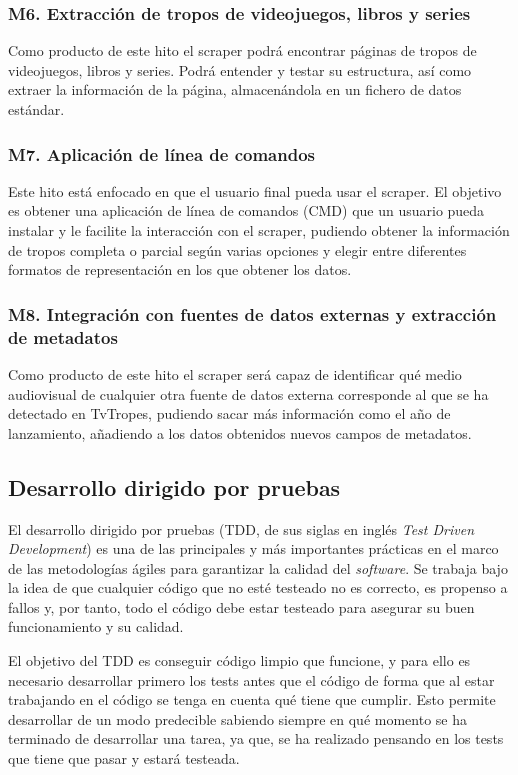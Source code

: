 \subsubsection{M6. Extracción de tropos de videojuegos, libros y series}
Como producto de este hito el scraper podrá encontrar páginas de tropos de videojuegos, libros y series. Podrá entender y testar su estructura, así como extraer la información de la página, almacenándola en un fichero de datos estándar.

\subsubsection{M7. Aplicación de línea de comandos}
Este hito está enfocado en que el usuario final pueda usar el scraper. El objetivo es obtener una aplicación de línea de comandos (CMD) que un usuario pueda instalar y le facilite la interacción con el scraper, pudiendo obtener la información de tropos completa o parcial según varias opciones y elegir entre diferentes formatos de representación en los que obtener los datos.

\subsubsection{M8. Integración con fuentes de datos externas y extracción de metadatos}
Como producto de este hito el scraper será capaz de identificar qué medio audiovisual de cualquier otra fuente de datos externa corresponde al que se ha detectado en TvTropes, pudiendo sacar más información como el año de lanzamiento, añadiendo a los datos obtenidos nuevos campos de metadatos.

\subsection{Desarrollo dirigido por pruebas}
El desarrollo dirigido por pruebas (TDD, de sus siglas en inglés \textit{Test Driven Development}) es una de las principales y más importantes prácticas en el marco de las metodologías ágiles para garantizar la calidad del \textit{software}. Se trabaja bajo la idea de que cualquier código que no esté testeado no es correcto, es propenso a fallos y, por tanto, todo el código debe estar testeado para asegurar su buen funcionamiento y su calidad.

El objetivo del TDD es conseguir código limpio que funcione, y para ello es necesario desarrollar primero los tests antes que el código de forma que al estar trabajando en el código se tenga en cuenta qué tiene que cumplir. Esto permite desarrollar de un modo predecible sabiendo siempre en qué momento se ha terminado de desarrollar una tarea, ya que, se ha realizado pensando en los tests que tiene que pasar y estará testeada. 

